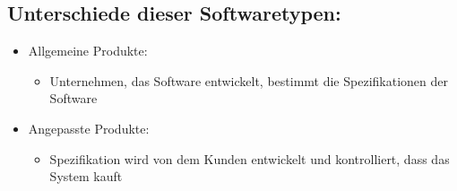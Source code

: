 \subsection{Unterschiede dieser Softwaretypen:}
\begin{itemize}
    \item Allgemeine Produkte:
    \begin{itemize}
        \item Unternehmen, das Software entwickelt, bestimmt die Spezifikationen der Software
    \end{itemize}
    \item Angepasste Produkte:
    \begin{itemize}
        \item Spezifikation wird von dem Kunden entwickelt und kontrolliert, dass das System kauft
    \end{itemize}
\end{itemize}

